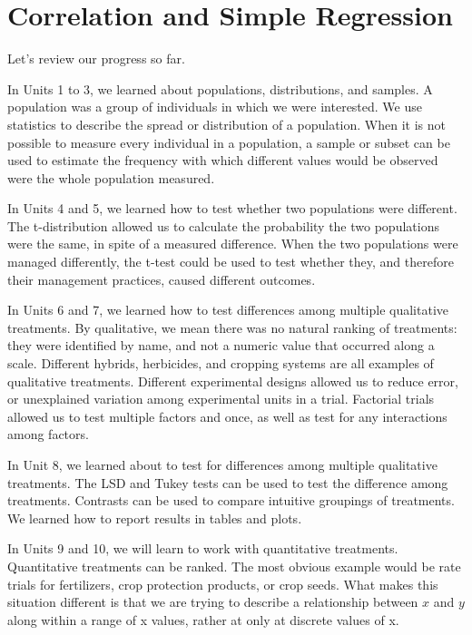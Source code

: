 \documentclass[
]{book}
\begin{document}
\hypertarget{correlation-and-simple-regression}{%
\chapter{Correlation and Simple Regression}\label{correlation-and-simple-regression}}

Let's review our progress so far.

In Units 1 to 3, we learned about populations, distributions, and samples. A population was a group of individuals in which we were interested. We use statistics to describe the spread or distribution of a population. When it is not possible to measure every individual in a population, a sample or subset can be used to estimate the frequency with which different values would be observed were the whole population measured.

In Units 4 and 5, we learned how to test whether two populations were different. The t-distribution allowed us to calculate the probability the two populations were the same, in spite of a measured difference. When the two populations were managed differently, the t-test could be used to test whether they, and therefore their management practices, caused different outcomes.

In Units 6 and 7, we learned how to test differences among multiple qualitative treatments. By qualitative, we mean there was no natural ranking of treatments: they were identified by name, and not a numeric value that occurred along a scale. Different hybrids, herbicides, and cropping systems are all examples of qualitative treatments. Different experimental designs allowed us to reduce error, or unexplained variation among experimental units in a trial. Factorial trials allowed us to test multiple factors and once, as well as test for any interactions among factors.

In Unit 8, we learned about to test for differences among multiple qualitative treatments. The LSD and Tukey tests can be used to test the difference among treatments. Contrasts can be used to compare intuitive groupings of treatments. We learned how to report results in tables and plots.

In Units 9 and 10, we will learn to work with quantitative treatments. Quantitative treatments can be ranked. The most obvious example would be rate trials for fertilizers, crop protection products, or crop seeds. What makes this situation different is that we are trying to describe a relationship between \(x\) and \(y\) along within a range of x values, rather at only at discrete values of x.
\end{document}
